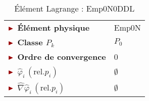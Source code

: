 \begin{table}[H]
\begin{minipage}[t]{0.48\linewidth}
\begin{tabular}{>{\bfseries} l|l}
			\midrule
			$\mytriangle$ Élément physique & \textcolor{MyRed}{Emp0N}\\
			$\mytriangle$ Classe $P_k$ & $P_0$\\
		    $\mytriangle$ Ordre de convergence & 0\\
		    \midrule
		    $\mytriangle$ $\widehat{\varphi}_i\, (\text{rel.} p_i)$ & $\emptyset$\\
		    \midrule
		    $\mytriangle$ $\widehat{\nabla}\widehat{\varphi}_i\, (\text{rel.} p_i)$ & $\emptyset$ \\
		    \bottomrule %
		    \end{tabular}
	\caption{Élément Lagrange : Emp0N0DDL}
    \label{tab:Emp0N0DDL}
\end{minipage}\hfill
\end{table}

